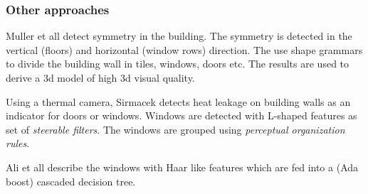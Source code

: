

\subsubsection{Other approaches}
Muller et all \cite{Muller_procedural} detect symmetry in the building. The
symmetry is detected in the vertical (floors) and horizontal (window
rows) direction.
The use shape grammars to divide the building wall in tiles, windows, doors etc.
The results are used to derive a 3d model of high 3d visual quality.

Using a thermal camera, Sirmacek \cite{Sirmacek_thermal}
detects heat leakage on building walls as an indicator for doors or windows.
Windows are detected with L-shaped features as set of \emph{steerable filters}.
The windows are grouped using \emph{perceptual organization rules}.

Ali et all \cite{Ali_facades}
describe the windows with Haar like features which are fed into a (Ada boost) cascaded decision tree.





